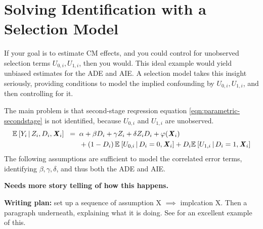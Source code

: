 \section{Solving Identification with a Selection Model}
\label{sec:selectionmodel}
If your goal is to estimate CM effects, and you could control for unobserved selection terms $U_{0,i}, U_{1,i}$, then you would.
This ideal example would yield unbiased estimates for the ADE and AIE.
A selection model takes this insight seriously, providing conditions to model the implied confounding by $U_{0,i}, U_{1,i}$, and then controlling for it.

The main problem is that second-stage reqression equation \eqref{eqn:parametric-secondstage} is not identified, because $U_{0,i}$ and $U_{1,i}$ are unobserved.
\begin{align*}
    \mathbb{E}_{} \left[ Y_i \, \middle\vert \, Z_i, D_i, \boldsymbol{\mathit{X}}_i \right] \;\; =& \;\;
        \alpha
        + \beta D_i
        + \gamma Z_i
        + \delta Z_i D_i
        + \varphi(\boldsymbol{\mathit{X}}_i) \\
        & \;\; +\left( 1 - D_i \right) \mathbb{E}_{} \left[  U_{0,i}  \, \middle\vert \, D_i = 0, \boldsymbol{\mathit{X}}_i \right]
            + D_i \mathbb{E}_{} \left[  U_{1,i}  \, \middle\vert \, D_i = 1, \boldsymbol{\mathit{X}}_i \right]
\end{align*}
The following assumptions are sufficient to model the correlated error terms, identifying $\beta, \gamma, \delta$, and thus both the ADE and AIE.

\textbf{Needs more story telling of how this happens.}

\textbf{Writing plan:} set up a sequence of assumption X $\implies$ implcation X.
Then a paragraph underneath, explaining what it is doing.
See \cite{kline2019heckits} for an excellent example of this.

